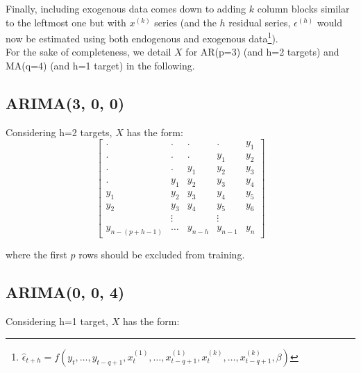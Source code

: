 \documentclass{article}
\begin{document}
Finally, including exogenous data comes down to adding $k$ column blocks similar to the leftmost one but with $x^{(k)}$ series (and the $h$ residual series, $\epsilon^{(h)}$ would now be estimated using both endogenous and exogenous data\footnote{$\hat{\epsilon}_{t+h} = f(y_{t},\ldots, y_{t-q+1}, x^{(1)}_{t},\ldots, x^{(1)}_{t-q+1},  x^{(k)}_{t},\ldots, x^{(k)}_{t-q+1},\beta)$}).\\

For the sake of completeness, we detail $X$ for AR(p=3) (and h=2 targets) and MA(q=4) (and h=1 target) in the following.

\subsection{ARIMA(3, 0, 0)} 
Considering h=2 targets, $X$ has the form:
$$\left[\begin{array}{ccc|cc}
. & . & .  & . & y_1 \\
. & . & .  & y_1 & y_2 \\
. & . & y_1 & y_2 & y_3 \\
. & y_1 & y_2  & y_3 & y_4\\
y_1 & y_2 & y_3  & y_4 & y_5 \\
y_2 & y_3 & y_4  & y_5 & y_6\\
 & \vdots &  & \vdots & \\
y_{n-(p+h-1)} & \dots & y_{n-h} & y_{n-1} & y_n
\end{array}\right]$$

where the first $p$ rows should be excluded from training.

\subsection{ARIMA(0, 0, 4)}
Considering h=1 target, $X$ has the form:
\end{document}
